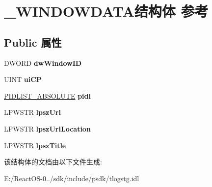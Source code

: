 \hypertarget{struct___w_i_n_d_o_w_d_a_t_a}{}\section{\+\_\+\+W\+I\+N\+D\+O\+W\+D\+A\+T\+A结构体 参考}
\label{struct___w_i_n_d_o_w_d_a_t_a}
\subsection*{Public 属性}
\begin{DoxyCompactItemize}
\item 
\mbox{\label{struct___w_i_n_d_o_w_d_a_t_a_a0e3b558c5efc3c86e3210b3eae543354}} 
D\+W\+O\+RD {\bfseries dw\+Window\+ID}
\item 
\mbox{\label{struct___w_i_n_d_o_w_d_a_t_a_a81720873cd71aa6fdd6353648c55bf2b}} 
U\+I\+NT {\bfseries ui\+CP}
\item 
\mbox{\label{struct___w_i_n_d_o_w_d_a_t_a_a9c52c36ff478582e1ffdddb8bf103b1f}} 
\hyperlink{struct___i_t_e_m_i_d_l_i_s_t___a_b_s_o_l_u_t_e}{P\+I\+D\+L\+I\+S\+T\+\_\+\+A\+B\+S\+O\+L\+U\+TE} {\bfseries pidl}
\item 
\mbox{\label{struct___w_i_n_d_o_w_d_a_t_a_aa6bb7ea76e54fdb3a7ca9d41ce8d24cf}} 
L\+P\+W\+S\+TR {\bfseries lpsz\+Url}
\item 
\mbox{\label{struct___w_i_n_d_o_w_d_a_t_a_a4339fb574bdd6219e1a75290aba86533}} 
L\+P\+W\+S\+TR {\bfseries lpsz\+Url\+Location}
\item 
\mbox{\label{struct___w_i_n_d_o_w_d_a_t_a_a376b03d7fb06b5830859c90b9aa81760}} 
L\+P\+W\+S\+TR {\bfseries lpsz\+Title}
\end{DoxyCompactItemize}


该结构体的文档由以下文件生成\+:\begin{DoxyCompactItemize}
\item 
E\+:/\+React\+O\+S-\/0../sdk/include/psdk/tlogstg.\+idl\end{DoxyCompactItemize}
